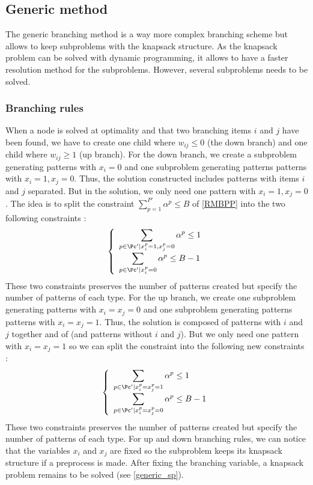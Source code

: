 \subsection{Generic method}
\label{generic}

The generic branching method is a way more complex branching scheme but allows to keep subproblems with the knapsack structure. As the knapsack problem can be solved with dynamic programming, it allows to have a faster resolution method for the subproblems. However, several subproblems needs to be solved.

\subsubsection{Branching rules}

When a node is solved at optimality and that two branching items $i$ and $j$ have been found, we have to create one child where $w_{ij} \leq 0$ (the down branch) and one child where $w_{ij} \geq 1$ (up branch). For the down branch, we create a subproblem generating patterns with $x_i = 0$ and one subproblem generating patterns patterns with $x_i = 1, x_j=0$. Thus, the solution constructed includes patterns with items $i$ and $j$ separated. But in the solution, we only need one pattern with $x_i = 1, x_j=0$. The idea is to split the constraint $\sum_{p=1}^{P'} \alpha^p \leq B$ of \eqref{RMBPP} into the two following constraints :
\begin{equation}
	\label{generic-down}
	\left \{
	\begin{array}{l}
	\displaystyle \sum_{p \in \Pc' | x_i^p=1, x_j^p=0} \alpha^p \leq 1 \\
	\displaystyle \sum_{p \in \Pc' | x_i^p=0} \alpha^p \leq B-1 \\
	\end{array}
	\right.
\end{equation}
These two constraints preserves the number of patterns created but specify the number of patterns of each type. For the up branch, we create one subproblem generating patterns with $x_i = x_j = 0$ and one subproblem generating patterns patterns with $x_i = x_j = 1$. Thus, the solution is composed of patterns with $i$ and $j$ together and of (and patterns without $i$ and $j$). But we only need one pattern with $x_i = x_j = 1$ so we can split the constraint into the following new constraints :
\begin{equation}	
	\label{generic-up}
	\left \{
	\begin{array}{l}
	\displaystyle \sum_{p \in \Pc' | x_i^p= x_j^p=1} \alpha^p \leq 1 \\
	\displaystyle \sum_{p \in \Pc' | x_i^p= x_j^p=0} \alpha^p \leq B-1 \\
	\end{array}
	\right.
\end{equation}
These two constraints preserves the number of patterns created but specify the number of patterns of each type. For up and down branching rules, we can notice that the variables $x_i$ and $x_j$ are fixed so the subproblem keeps its knapsack structure if a preprocess is made. After fixing the branching variable, a knapsack problem remains to be solved (see \ref{generic_sp}).

